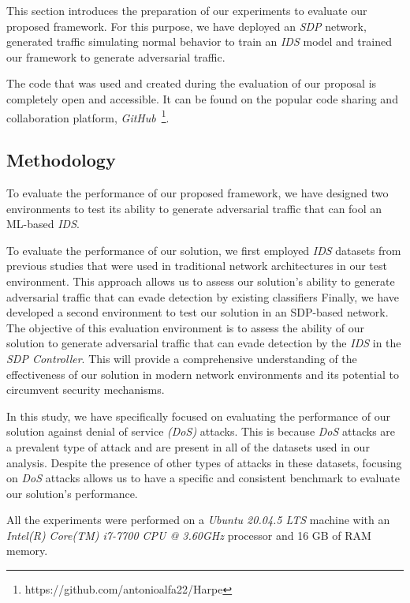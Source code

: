 This section introduces the preparation of our experiments to evaluate our proposed framework.
For this purpose, we have deployed an \textit{SDP} network, generated traffic simulating normal behavior to train an
\textit{IDS} model and trained our framework to generate adversarial traffic.

The code that was used and created during the evaluation of our proposal is completely open and accessible.
It can be found on the popular code sharing and collaboration platform,
\textit{GitHub}~\footnote{https://github.com/antonioalfa22/Harpe}.

\subsection{Methodology}\label{subsec:methodology}
To evaluate the performance of our proposed framework, we have designed two environments to test its ability to
generate adversarial traffic that can fool an ML-based \textit{IDS}.

To evaluate the performance of our solution, we first employed \textit{IDS} datasets from previous studies that were
used in traditional network architectures in our test environment.
This approach allows us to assess our solution's ability to generate adversarial traffic that can evade detection by
existing classifiers
Finally, we have developed a second environment to test our solution in an SDP-based network.
The objective of this evaluation environment is to assess the ability of our solution to generate adversarial traffic
that can evade detection by the \textit{IDS} in the \textit{SDP Controller}.
This will provide a comprehensive understanding of the effectiveness of our solution in modern network environments
and its potential to circumvent security mechanisms.

In this study, we have specifically focused on evaluating the performance of our solution against denial of service
\textit{(DoS)} attacks.
This is because \textit{DoS} attacks are a prevalent type of attack and are present in all of the datasets used in our
analysis.
Despite the presence of other types of attacks in these datasets, focusing on \textit{DoS} attacks allows us to have a
specific and consistent benchmark to evaluate our solution's performance.

All the experiments were performed on a \textit{Ubuntu 20.04.5 LTS} machine with an
\textit{Intel(R) Core(TM) i7-7700 CPU @ 3.60GHz} processor and 16 GB of RAM memory.

